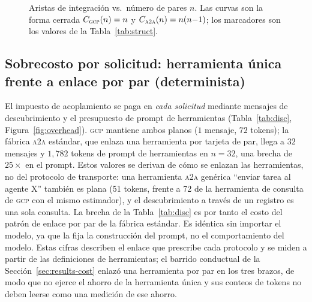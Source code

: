 \documentclass[conference,letterpaper]{IEEEtran}
\newcommand{\gcp}{\textsc{gcp}}
\newcommand{\ata}{\textsc{a2a}}
\newcommand{\bigoh}{\mathcal{O}}
\begin{document}
\begin{figure}[H]
\centering
{}
\caption{Aristas de integraci\'on vs.\ n\'umero de pares $n$. Las curvas son la forma cerrada
$C_{\gcp{}}(n)=n$ y $C_{\ata{}}(n)=n(n{-}1)$; los marcadores son los valores de la Tabla~\ref{tab:struct}.}
\label{fig:coupling}
\end{figure}

\subsection{Sobrecosto por solicitud: herramienta única frente a enlace por par (determinista)}
El impuesto de acoplamiento se paga en \emph{cada solicitud} mediante mensajes de descubrimiento y el
presupuesto de prompt de herramientas (Tabla~\ref{tab:disc}, Figura~\ref{fig:overhead}). \gcp{} mantiene
ambos planos ($1$ mensaje, $72$ tokens); la fábrica \ata{} estándar, que enlaza una herramienta por
tarjeta de par, llega a $32$ mensajes y $1{,}782$ tokens de prompt de herramientas en $n{=}32$, una brecha
de $25\times$ en el prompt. Estos valores se derivan de cómo se enlazan las herramientas, no del
protocolo de transporte: una herramienta \ata{} genérica ``enviar tarea al agente X'' también es plana
(51 tokens, frente a 72 de la herramienta de consulta de \gcp{} con el mismo estimador), y el
descubrimiento a través de un registro es una sola consulta. La brecha de la Tabla~\ref{tab:disc} es por
tanto el costo del patrón de enlace por par de la fábrica estándar. Es idéntica sin importar el modelo,
ya que la fija la construcción del prompt, no el comportamiento del modelo. Estas cifras describen el
enlace que prescribe cada protocolo y se miden a partir de las definiciones de herramientas; el barrido
conductual de la Sección~\ref{sec:results-cost} enlazó una herramienta por par en los tres brazos, de
modo que no ejerce el ahorro de la herramienta única y sus conteos de tokens no deben leerse como una
medición de ese ahorro.
\end{document}
